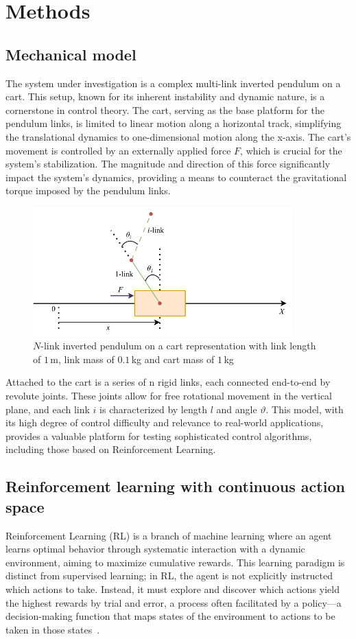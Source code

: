 \section{Methods}
\subsection{Mechanical model}
The system under investigation is a complex multi-link inverted pendulum on a cart. This setup, known for its inherent instability and dynamic nature, is a cornerstone in control theory. The cart, serving as the base platform for the pendulum links, is limited to linear motion along a horizontal track, simplifying the translational dynamics to one-dimensional motion along the x-axis. The cart's movement is controlled by an externally applied force $F$, which is crucial for the system's stabilization. The magnitude and direction of this force significantly impact the system's dynamics, providing a means to counteract the gravitational torque imposed by the pendulum links. 

\begin{figure}[h]
\centering
\includegraphics[width=10cm]{Figures/PendulumFinal_.pdf}
\caption{$N$-link inverted pendulum on a cart representation with link length of $1\,$m, link mass of $0.1\,$kg and cart mass of $1\,$kg~\cite{manzl2023relrl}}
\label{fig: n-pendulum on a cart}
\end{figure}

Attached to the cart is a series of n rigid links, each connected end-to-end by revolute joints. These joints allow for free rotational movement in the vertical plane, and each link 
$i$ is characterized by length $l$ and angle $\vartheta$.
This model, with its high degree of control difficulty and relevance to real-world applications, provides a valuable platform for testing sophisticated control algorithms, including those based on Reinforcement Learning.

\subsection{Reinforcement learning with continuous action space}
Reinforcement Learning (RL) is a branch of machine learning where an agent learns optimal behavior through systematic interaction with a dynamic environment, aiming to maximize cumulative rewards. This learning paradigm is distinct from supervised learning; in RL, the agent is not explicitly instructed which actions to take. Instead, it must explore and discover which actions yield the highest rewards by trial and error, a process often facilitated by a policy—a decision-making function that maps states of the environment to actions to be taken in those states~\cite{sutton_reinforcement_2018}.

